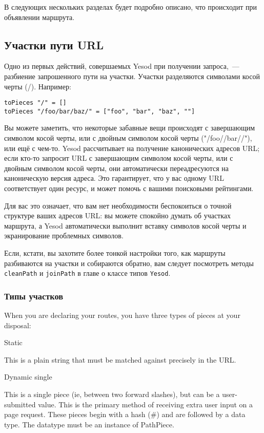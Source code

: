 В следующих нескольких разделах будет подробно описано, что происходит
при объявлении маршрута.

\subsection{Участки пути URL}
Одно из первых действий, совершаемых Yesod при получении запроса,~---
разбиение запрошенного пути на участки.  Участки разделяются символами
косой черты (/). Например:
\begin{lstlisting}
toPieces "/" = []
toPieces "/foo/bar/baz/" = ["foo", "bar", "baz", ""]
\end{lstlisting}

Вы можете заметить, что некоторые забавные вещи происходят с
завершающим символом косой черты, или с двойным символом косой черты
("/foo//bar//"), или ещё с чем-то. Yesod рассчитывает на получение
канонических адресов URL; если кто-то запросит URL с завершающим
символом косой черты, или с двойным символом косой черты, они
автоматически переадресуются на каноническую версия адреса. Это
гарантирует, что у вас одному URL соответствует один ресурс, и может
помочь с вашими поисковыми рейтингами.

Для вас это означает, что вам нет необходимости беспокоиться о точной
структуре ваших адресов URL: вы можете спокойно думать об участках
маршрута, а Yesod автоматически выполнит вставку символов косой черты
и экранирование проблемных символов.

Если, кстати, вы захотите более тонкой настройки того, как маршруты
разбиваются на участки и собираются обратно, вам следует посмотреть
методы \lstinline!cleanPath! и \lstinline!joinPath! в главе о классе
типов \lstinline!Yesod!.

\subsubsection{Типы участков}

When you are declaring your routes, you have three types of pieces at
your disposal:

Static

This is a plain string that must be matched against precisely in the
URL.

Dynamic single

This is a single piece (ie, between two forward slashes), but can be a
user-submitted value. This is the primary method of receiving extra
user input on a page request. These pieces begin with a hash (\#) and
are followed by a data type. The datatype must be an instance of
PathPiece.

